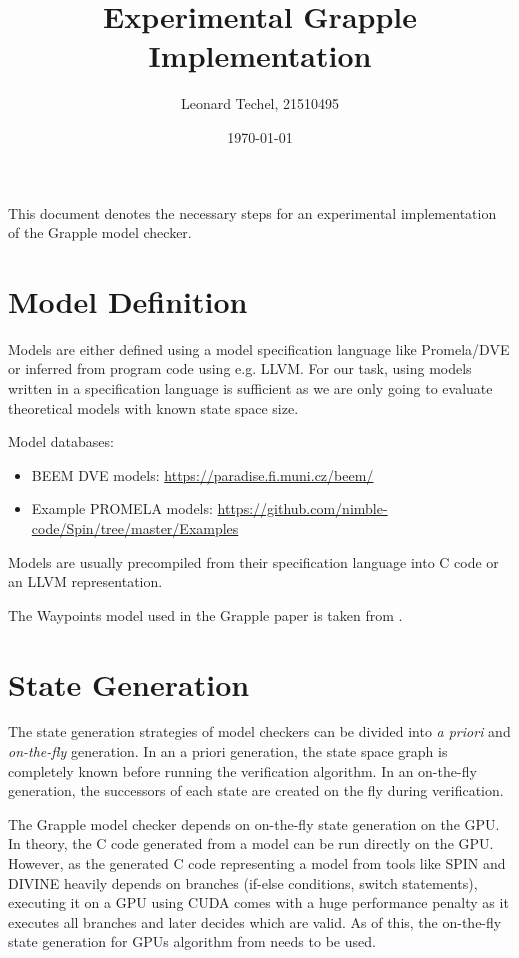 \documentclass[a4paper]{scrartcl}
\title{Experimental Grapple Implementation}
\author{Leonard Techel, 21510495}
\date{\today}
\begin{document}
\maketitle

This document denotes the necessary steps for an experimental implementation of the Grapple model checker.

\tableofcontents

\section{Model Definition}

Models are either defined using a model specification language like Promela/DVE or inferred from program code using e.g. LLVM.
For our task, using models written in a specification language is sufficient as we are only going to evaluate theoretical models with known state space size.

Model databases:

\begin{itemize}
    \item BEEM DVE models: \url{https://paradise.fi.muni.cz/beem/}
    \item Example PROMELA models: \url{https://github.com/nimble-code/Spin/tree/master/Examples}
\end{itemize}

Models are usually precompiled from their specification language into C code or an LLVM representation.

The Waypoints model used in the Grapple paper is taken from \cite{Holzmann2011.Swarm-Verification-Techniques}.


\section{State Generation}

The state generation strategies of model checkers can be divided into \emph{a priori} and \emph{on-the-fly} generation.
In an a priori generation, the state space graph is completely known before running the verification algorithm.
In an on-the-fly generation, the successors of each state are created on the fly during verification.

The Grapple model checker depends on on-the-fly state generation on the GPU.
In theory, the C code generated from a model can be run directly on the GPU.
However, as the generated C code representing a model from tools like SPIN and DIVINE heavily depends on branches (if-else conditions, switch statements), executing it on a GPU using CUDA comes with a huge performance penalty as it executes all branches and later decides which are valid.
As of this, the on-the-fly state generation for GPUs algorithm from \cite{Bartocci2014.GPGPU-Parallel-SPIN} needs to be used.
\end{document}
